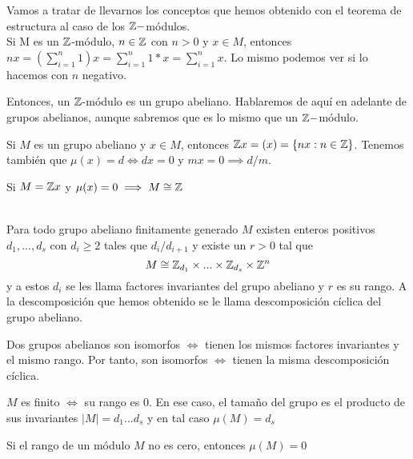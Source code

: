 Vamos a tratar de llevarnos los conceptos que hemos obtenido con el teorema de estructura al caso de los $\mathbb{Z}-$módulos.\\
Si M es un $\mathbb{Z}$-módulo, $n\in \mathbb{Z}$ con $n>0$ y $x\in M$, entonces $nx = (\sum_{i=1}^n 1)x = \sum_{i=1}^n 1*x = \sum_{i=1}^n x$. Lo mismo podemos ver si lo hacemos con $n$ negativo.

Entonces, un $\mathbb{Z}$-módulo es un grupo abeliano. Hablaremos de aquí en adelante de grupos abelianos, aunque sabremos que es lo mismo que un $\mathbb{Z}-$módulo.

Si $M$ es un grupo abeliano y $x\in M$, entonces $\mathbb{Z} x = (x) = \{nx : n \in \mathbb{Z}  \}$.
Tenemos también que $\mu(x) = d \iff dx = 0$ y $mx = 0 \implies d/m$.

Si $M=\mathbb{Z} x$ y $\mu(x) = 0 \implies M \cong \mathbb{Z}$

\begin{nth}\hfill \\
	Para todo grupo abeliano finitamente generado $M$ existen enteros positivos $d_1,...,d_s$ con $d_i \geq 2$ tales que $d_i/d_{i+1}$ y existe un $r> 0$ tal que
	\[
	M \cong \mathbb{Z}_{d_1} \times ... \times \mathbb{Z}_{d_s} \times \mathbb{Z}^n
	\]
	y a estos $d_i$ se les llama factores invariantes del grupo abeliano y $r$ es su rango.
	A la descomposición que hemos obtenido se le llama descomposición cíclica del grupo abeliano.
\end{nth}

\begin{nprop}
	Dos grupos abelianos son isomorfos $\iff$ tienen los mismos factores invariantes y el mismo rango. Por tanto, son isomorfos $\iff$ tienen la misma descomposición cíclica.
\end{nprop}

\begin{nprop}
	$M$ es finito $\iff$ su rango es 0. En ese caso, el tamaño del grupo es el producto de sus invariantes  $|M| = d_1...d_s$ y en tal caso $\mu(M) = d_s$
\end{nprop}
\begin{nprop}
	Si el rango de un módulo $M$ no es cero, entonces $\mu(M) =0$
\end{nprop}

